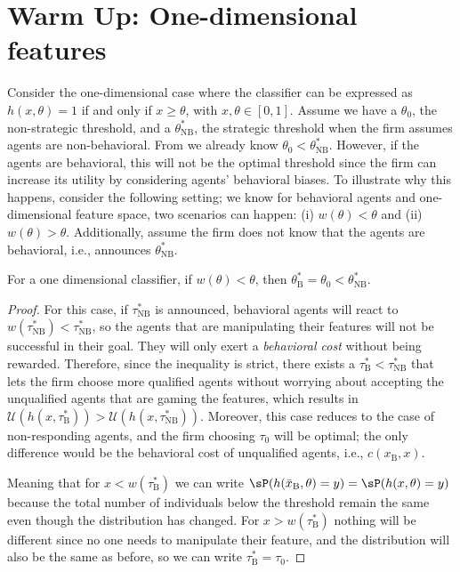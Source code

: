 \section{Warm Up: One-dimensional features}
Consider the one-dimensional case where the classifier can be expressed as $h(x, \theta) = 1$ if and only if $x\ge \theta$, with $x, \theta \in [0,1]$. Assume we have a $\theta_0$, the non-strategic threshold, and a $\theta^*_\text{NB}$, the strategic threshold when the firm assumes agents are non-behavioral. From \cite{Milli2019socialcost} we already know $\theta_0 < \theta^*_\text{NB}$. However, if the agents are behavioral, this will not be the optimal threshold since the firm can increase its utility by considering agents' behavioral biases. To illustrate why this happens, consider the following setting; we know for behavioral agents and one-dimensional feature space, two scenarios can happen: (i) $w(\theta) < \theta$ and (ii) $w(\theta) > \theta$. Additionally, assume the firm does not know that the agents are behavioral, i.e., announces $\theta^*_\text{NB}$. 

\begin{proposition}\label{prop:B-NB_1D}
    For a one dimensional classifier, if $w(\theta)<\theta$, then $\theta^*_\text{B} = \theta_0 < \theta^*_\text{NB}$.
\end{proposition}
\begin{proof}
For this case, if $\tau^*_\text{NB}$ is announced, behavioral agents will react to $w(\tau^*_\text{NB})<\tau^*_\text{NB}$, so the agents that are manipulating their features will not be successful in their goal. They will only exert a \emph{behavioral cost} without being rewarded. Therefore, since the inequality is strict, there exists a $\tau^*_\text{B} < \tau^*_\text{NB}$ that lets the firm choose more qualified agents without worrying about accepting the unqualified agents that are gaming the features, which results in $\mathcal{U}(h(x, \tau^*_\text{B}))> \mathcal{U}(h(x, \tau^*_\text{NB}))$. Moreover, this case reduces to the case of non-responding agents, and the firm choosing $\tau_0$ will be optimal; the only difference would be the behavioral cost of unqualified agents, i.e., $c(x_\text{B}, x)$. 

Meaning that for $x<w(\tau^*_\text{B})$ we can write $\sP(h(\bar x_\text{B}, \theta)=y)=\sP(h(x, \theta)=y)$ because the total number of individuals below the threshold remain the same even though the distribution has changed. For $x>w(\tau^*_\text{B})$ nothing will be different since no one needs to manipulate their feature, and the distribution will also be the same as before, so we can write $\tau^*_\text{B}=\tau_0$.
\end{proof}

